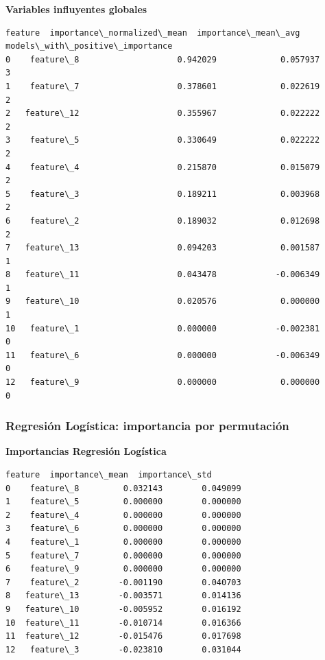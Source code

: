 \documentclass[11pt]{article}
\begin{document}
    \textbf{Variables influyentes globales}

    
    
    \begin{Verbatim}[commandchars=\\\{\}]
       feature  importance\_normalized\_mean  importance\_mean\_avg  models\_with\_positive\_importance
0    feature\_8                    0.942029             0.057937                                3
1    feature\_7                    0.378601             0.022619                                2
2   feature\_12                    0.355967             0.022222                                2
3    feature\_5                    0.330649             0.022222                                2
4    feature\_4                    0.215870             0.015079                                2
5    feature\_3                    0.189211             0.003968                                2
6    feature\_2                    0.189032             0.012698                                2
7   feature\_13                    0.094203             0.001587                                1
8   feature\_11                    0.043478            -0.006349                                1
9   feature\_10                    0.020576             0.000000                                1
10   feature\_1                    0.000000            -0.002381                                0
11   feature\_6                    0.000000            -0.006349                                0
12   feature\_9                    0.000000             0.000000                                0
    \end{Verbatim}

    
    \subsubsection{Regresión Logística: importancia por
permutación}\label{regresiuxf3n-loguxedstica-importancia-por-permutaciuxf3n}

    
    \textbf{Importancias Regresión Logística}

    
    
    \begin{Verbatim}[commandchars=\\\{\}]
       feature  importance\_mean  importance\_std
0    feature\_8         0.032143        0.049099
1    feature\_5         0.000000        0.000000
2    feature\_4         0.000000        0.000000
3    feature\_6         0.000000        0.000000
4    feature\_1         0.000000        0.000000
5    feature\_7         0.000000        0.000000
6    feature\_9         0.000000        0.000000
7    feature\_2        -0.001190        0.040703
8   feature\_13        -0.003571        0.014136
9   feature\_10        -0.005952        0.016192
10  feature\_11        -0.010714        0.016366
11  feature\_12        -0.015476        0.017698
12   feature\_3        -0.023810        0.031044
    \end{Verbatim}
\end{document}
